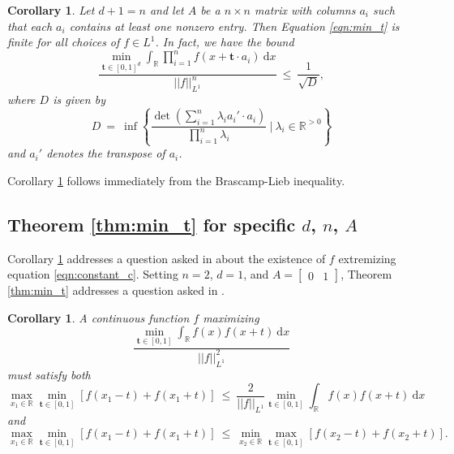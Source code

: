 \documentclass[11pt,reqno]{amsart}
\numberwithin{equation}{section}
\theoremstyle{plain}
\newtheorem{corollary}[thm]{Corollary}
\newcommand{\R}{\ensuremath{\mathbb{R}}}
\begin{document}
\begin{corollary}\label{cor:A_condition}
Let $d + 1 = n$ and let $A$ be a $n \times n$ matrix with columns $a_i$ such that each $a_i$ contains at least one nonzero entry.
Then Equation \ref{eqn:min_t} is finite for all choices of $f \in L^1$. In fact, we have the bound
\begin{equation}
    \displaystyle\frac{\min\limits_{\mathbf{t}\in[0,1]^d}\displaystyle\int_{\R} \prod\limits_{i=1}^{n}f(x+\mathbf{t}\cdot a_i)\ \mathrm{d}x}{||f||_{L^1}^{n}}\ \leq\ \frac{1}{\sqrt{D}},
\end{equation}
where $D$ is given by
\begin{equation}
    \displaystyle D\ =\ \inf \left\{\frac{\det\left(\sum\limits_{i=1}^{n}\lambda_ia_i'\cdot{}a_i\right)}{\prod\limits_{i=1}^{n}\lambda_i} \ \Bigg| \ \lambda_i \in \mathbb{R}^{>0}  \right\}
\end{equation}
and $a_i'$ denotes the transpose of $a_i$.
\end{corollary}

Corollary \ref{cor:A_condition} follows immediately from the Brascamp-Lieb inequality.

\subsection{Theorem \ref{thm:min_t} for specific $d$, $n$, $A$}\label{subsection:corollaries}

Corollary \ref{cor:one_t} addresses a question asked in \cite{BS} about the existence of $f$ extremizing equation \eqref{eqn:constant_c}. Setting $n = 2$, $d = 1$, and $A = \begin{bmatrix} 0 & 1 \end{bmatrix}$, Theorem \ref{thm:min_t} addresses a question asked in \cite{BS}.

\begin{corollary}\label{cor:one_t}
A continuous function $f$ maximizing
\begin{equation}
    \frac{\min\limits_{\mathbf{t}\in[0,1]}\displaystyle\int_{\R}f(x)f(x+t)\ \mathrm{d}x}{||f||_{L^1}^{2}}
\end{equation}
must satisfy both
\begin{equation}
    \max\limits_{x_1 \in \R}\min\limits_{\mathbf{t}\in[0,1]}[f(x_1-t)+f(x_1+t)]\ \le \ \frac{2}{||f||_{L^1}}\min\limits_{\mathbf{t}\in[0,1]}\int_{\R}f(x)f(x+t)\ \mathrm{d}x
\end{equation}
and
\begin{equation}
    \max\limits_{x_1 \in \R}\min\limits_{\mathbf{t}\in[0,1]}[f(x_1-t)+f(x_1+t)]\ \le \ \min\limits_{x_2 \in \R}\max\limits_{\mathbf{t}\in[0,1]}[f(x_2-t)+f(x_2+t)].
\end{equation}
\end{corollary}
\end{document}
